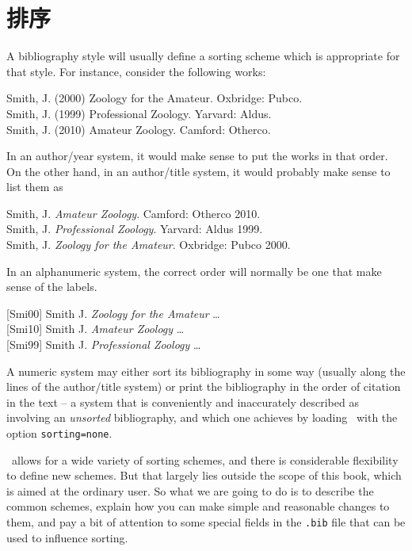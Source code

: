 \chapter{排序}\label{ch:sorting}

A bibliography style will usually define a sorting scheme which is
appropriate for that style. For instance, consider the following works:

\medskip
\colorbox{red!40}%
    {Smith, J. (2000) Zoology for the Amateur. Oxbridge: Pubco.}\\
\colorbox{green!40}%
    {Smith, J. (1999) Professional Zoology. Yarvard: Aldus.}\\
\colorbox{blue!40}%
    {Smith, J. (2010) Amateur Zoology. Camford: Otherco.}
\medskip

In an author/year system, it would make sense to put the works in that
order. On the other hand, in an author/title system, it would probably
make sense to list them as

\medskip
\colorbox{blue!40}%
    {Smith, J. \emph{Amateur Zoology}. Camford: Otherco 2010.}\\
\colorbox{green!40}%
    {Smith, J. \emph{Professional Zoology}. Yarvard: Aldus 1999.}\\
\colorbox{red!40}%
    {Smith, J. \emph{Zoology for the Amateur}. Oxbridge: Pubco 2000.}
\medskip

In an alphanumeric system, the correct order will normally be one
that make sense of the labels.

\medskip
\colorbox{red!40}
    {{[}Smi00{]} Smith J. \emph{Zoology for the Amateur} \ldots{}}\\
\colorbox{blue!40}
    {{[}Smi10{]} Smith J. \emph{Amateur Zoology} \ldots{}}\\
\colorbox{green!40}
    {{[}Smi99{]} Smith J. \emph{Professional Zoology} \ldots{}}
\medskip

A numeric system may either sort its bibliography in some way (usually
along the lines of the author/title system) or print the bibliography in
the order of citation in the text -- a system that is conveniently and
inaccurately described as involving an \emph{unsorted} bibliography, and
which one achieves by loading \biblatex\ with the option
\texttt{sorting=none}.

\biblatex\ allows for a wide variety of sorting schemes, and there is
considerable flexibility to define new schemes. But that largely lies
outside the scope of this book, which is aimed at the ordinary user. So
what we are going to do is to describe the common schemes, explain how
you can make simple and reasonable changes to them, and pay a bit of
attention to some special fields in the \texttt{.bib} file that can be
used to influence sorting.

